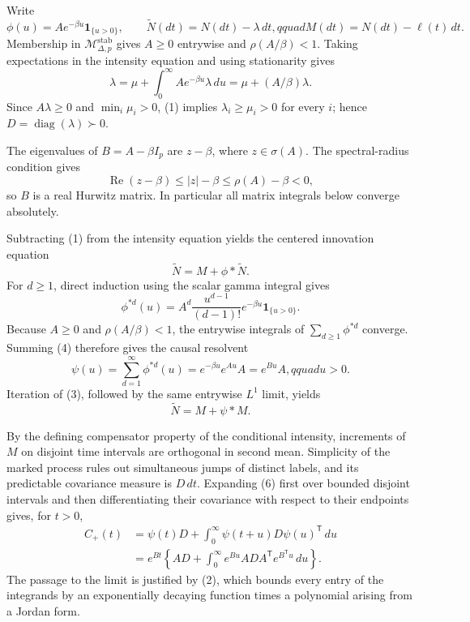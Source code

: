 Write
\[
 \phi(u)=Ae^{-\beta u}\mathbf 1_{\{u>0\}},\qquad
 \widetilde N(dt)=N(dt)-\lambda\,dt,qquad
 M(dt)=N(dt)-\ell(t)\,dt.
\]
Membership in \(\mathcal M_{\Delta,p}^{\mathrm{stab}}\) gives \(A\geq0\) entrywise and \(\rho(A/\beta)<1\).  Taking expectations in the intensity equation and using stationarity gives
\[
 \lambda=\mu+\int_0^\infty Ae^{-\beta u}\lambda\,du
 =\mu+(A/\beta)\lambda.
\tag{1}
\]
Since \(A\lambda\geq0\) and \(\min_i\mu_i>0\), (1) implies \(\lambda_i\geq\mu_i>0\) for every \(i\); hence \(D=\operatorname{diag}(\lambda)\succ0\).

The eigenvalues of \(B=A-\beta I_p\) are \(z-\beta\), where \(z\in\sigma(A)\).  The spectral-radius condition gives
\[
 \operatorname{Re}(z-\beta)\leq |z|-\beta\leq\rho(A)-\beta<0,
\tag{2}
\]
so \(B\) is a real Hurwitz matrix.  In particular all matrix integrals below converge absolutely.

Subtracting (1) from the intensity equation yields the centered innovation equation
\[
 \widetilde N=M+\phi*\widetilde N.
\tag{3}
\]
For \(d\geq1\), direct induction using the scalar gamma integral gives
\[
 \phi^{*d}(u)=A^d\frac{u^{d-1}}{(d-1)!}e^{-\beta u}\mathbf1_{\{u>0\}}.
\tag{4}
\]
Because \(A\geq0\) and \(\rho(A/\beta)<1\), the entrywise integrals of \(\sum_{d\geq1}\phi^{*d}\) converge.  Summing (4) therefore gives the causal resolvent
\[
 \psi(u)=\sum_{d=1}^{\infty}\phi^{*d}(u)
 =e^{-\beta u}e^{Au}A=e^{Bu}A,qquad u>0.
\tag{5}
\]
Iteration of (3), followed by the same entrywise \(L^1\) limit, yields
\[
 \widetilde N=M+\psi*M.
\tag{6}
\]

By the defining compensator property of the conditional intensity, increments of \(M\) on disjoint time intervals are orthogonal in second mean.  Simplicity of the marked process rules out simultaneous jumps of distinct labels, and its predictable covariance measure is \(D\,dt\).  Expanding (6) first over bounded disjoint intervals and then differentiating their covariance with respect to their endpoints gives, for \(t>0\),
\[
 \begin{aligned}
 C_+(t)
 &=\psi(t)D+\int_0^\infty\psi(t+u)D\psi(u)^{\mathsf T}\,du\\
 &=e^{Bt}\left\{AD+\int_0^\infty e^{Bu}ADA^{\mathsf T}e^{B^{\mathsf T}u}\,du\right\}.
 \end{aligned}
\tag{7}
\]
The passage to the limit is justified by (2), which bounds every entry of the integrands by an exponentially decaying function times a polynomial arising from a Jordan form.


